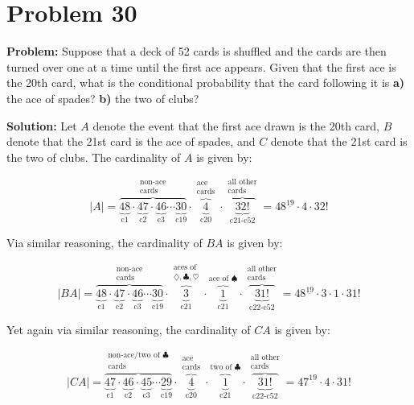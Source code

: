 \documentclass{article}
\begin{document}
\section*{Problem 30}
\noindent\textbf{Problem:} Suppose that a deck of 52 cards is shuffled and the cards are then turned over one at a time until the first ace appears. Given that the first ace is the 20th card, what is the conditional probability that the card following it is \textbf{a)} the ace of spades? \textbf{b)} the two of clubs?
\bigskip

\noindent\textbf{Solution:} Let $A$ denote the event that the first ace drawn is the 20th card, $B$ denote that the 21st card is the ace of spades, and $C$ denote that the 21st card is the two of clubs. The cardinality of $A$ is given by:

\begin{equation*}
    |A|=\overbrace{\underbrace{48}_{\text{c1}}\cdot
    \underbrace{47}_{\text{c2}}\cdot
    \underbrace{46}_{\text{c3}}\cdots
    \underbrace{30}_{\text{c19}}}^{\substack{\text{non-ace}\\\text{cards}}}\cdot\overbrace{\underbrace{4}_{\text{c20}}}^{\substack{\text{ace}\\\text{cards}}}\cdot\overbrace{\underbrace{32!}_{\text{c21-c52}}}^{\substack{\text{all other}\\\text{cards}}}=48^{\underline{19}}\cdot 4\cdot 32!
\end{equation*}

Via similar reasoning, the cardinality of $BA$ is given by:

\begin{equation*}
    |BA|=\overbrace{\underbrace{48}_{\text{c1}}\cdot
    \underbrace{47}_{\text{c2}}\cdot
    \underbrace{46}_{\text{c3}}\cdots
    \underbrace{30}_{\text{c19}}}^{\substack{\text{non-ace}\\\text{cards}}}\cdot
    \overbrace{\underbrace{3}_{\text{c21}}}^{\substack{\text{aces of}\\\diamondsuit,\clubsuit,\heartsuit}}\cdot
    \overbrace{\underbrace{1}_{\text{c21}}}^{\text{ace of }\spadesuit}\cdot
    \overbrace{\underbrace{31!}_{\text{c22-c52}}}^{\substack{\text{all other}\\\text{cards}}}
    =48^{\underline{19}}\cdot 3\cdot 1\cdot 31!
\end{equation*}

Yet again via similar reasoning, the cardinality of $CA$ is given by:

\begin{equation*}
    |CA|=\overbrace{\underbrace{47}_{\text{c1}}\cdot
    \underbrace{46}_{\text{c2}}\cdot
    \underbrace{45}_{\text{c3}}\cdots
    \underbrace{29}_{\text{c19}}}^{\substack{\text{non-ace/two of }{\clubsuit}\\\text{cards}}}\cdot
    \overbrace{\underbrace{4}_{\text{c20}}}^{\substack{\text{ace}\\\text{cards}}}\cdot
    \overbrace{\underbrace{1}_{\text{c21}}}^{\text{two of }\clubsuit}\cdot
    \overbrace{\underbrace{31!}_{\text{c22-c52}}}^{\substack{\text{all other}\\\text{cards}}}
    =47^{\underline{19}}\cdot 4\cdot 31!
\end{equation*}
\end{document}
